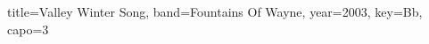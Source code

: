 \documentclass{skrul-leadsheet}
\begin{document}
\newcommand{\lyric}[2]{
\begin{tabular}{|lp{33em}}
\hline
\textbf{#1.} & #2
\end{tabular} \\ }

\begin{song}[transpose-capo=true]{title={Valley Winter Song}, band={Fountains Of Wayne}, year={2003}, key={Bb}, capo={3}}



\end{song}
\end{document}
